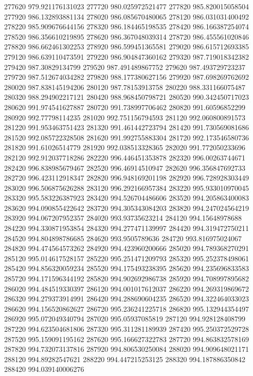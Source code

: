 {277620 979.921176131023
277720 980.025972521477
277820 985.820015058504
277920 986.132893881134
278020 986.085670480065
278120 986.031031400492
278220 985.909676644156
278320 986.184465198535
278420 986.166387254074
278520 986.356610219895
278620 986.367048039314
278720 986.455561020846
278820 986.662461302253
278920 986.599451365581
279020 986.615712693385
279120 986.639110473591
279220 986.904847360162
279320 987.719018342382
279420 987.30829134799
279520 987.491489867752
279620 987.493729723237
279720 987.512674034282
279820 988.177380627156
279920 987.698269762692
280020 987.838145194206
280120 987.78153913758
280220 988.331166075487
280320 988.294902217121
280420 988.968450798721
280520 990.342450717023
280620 991.974541627887
280720 991.738997706462
280820 991.60596852299
280920 992.77798114235
281020 992.751156794593
281120 992.060800891573
281220 991.953463751423
281320 991.461442723794
281420 991.730569081686
281520 992.085722328508
281620 991.992755883304
281720 992.173546580736
281820 991.61026514779
281920 992.038513328365
282020 991.772050233696
282120 992.912037718286
282220 996.446451353878
282320 996.00263744671
282420 996.838985679467
282520 996.46914510947
282620 996.356847692733
282720 996.423112918347
282820 996.948169201198
282920 996.728928303449
283020 996.506875626288
283120 996.292166957384
283220 995.933010970045
283320 995.583226387923
283420 994.526704486606
283520 994.205863400083
283620 994.090855422642
283720 994.305343084203
283820 994.247024564219
283920 994.067207952357
284020 993.93735623214
284120 994.15648978688
284220 994.330871953854
284320 994.277471139997
284420 994.319472750211
284520 994.804898786685
284620 993.9505789636
284720 993.816975024067
284820 994.474564573262
284920 994.423960200666
285020 994.789368270291
285120 995.014617528157
285220 995.251471209793
285320 995.252378498061
285420 994.856320059234
285520 994.175493238395
285620 994.235696833583
285720 994.171596344192
285820 994.902692986738
285920 994.708997895682
286020 994.484519330397
286120 994.001017612037
286220 994.269319869672
286320 994.279373914991
286420 994.288690604235
286520 994.322464033023
286620 994.156520862627
286720 995.236241225718
286820 995.132944354497
286920 995.072049340794
287020 995.05937085819
287120 994.928128408799
287220 994.623504681806
287320 995.311281189939
287420 995.250372529728
287520 995.159091195162
287620 995.166627322783
287720 994.863832578169
287820 994.732073137816
287920 994.806530250084
288020 994.909648021171
288120 994.89282547621
288220 994.447215253125
288320 994.187886350842
288420 994.039140006276
}
